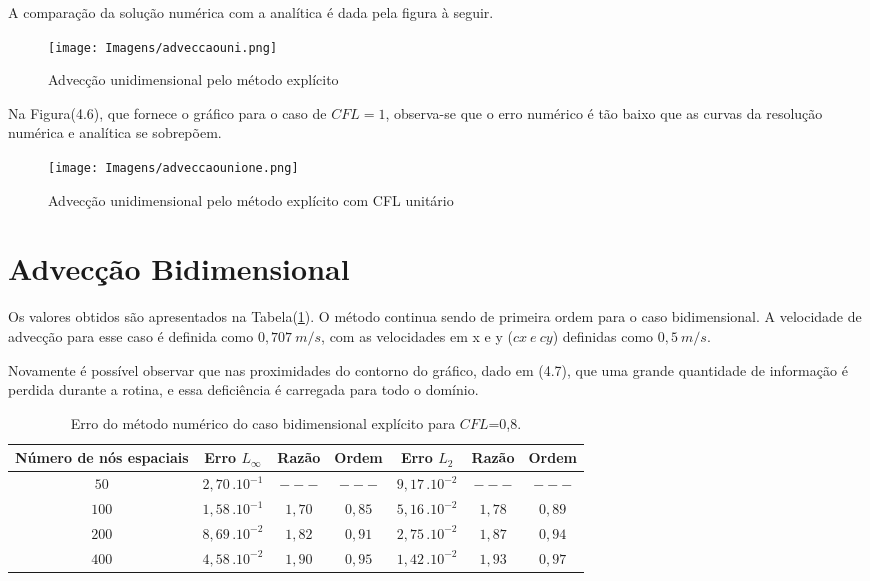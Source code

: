 	A comparação da solução numérica com a analítica é dada pela figura à seguir.
	
\begin{figure}[ht!]
	\label{advexplicito}
	\centering
	\texttt{[image: Imagens/adveccaouni.png]}
	\caption{Advecção unidimensional pelo método explícito}
\end{figure}

	Na Figura(4.6), que fornece o gráfico para o caso de $CFL=1$, observa-se que o erro numérico é tão baixo que as curvas da resolução numérica e analítica se sobrepõem.

\newpage

\begin{figure}[ht!]
	\label{advexplicitoone}
	\centering
	\texttt{[image: Imagens/adveccaounione.png]}
	\caption{Advecção unidimensional pelo método explícito com CFL unitário}
\end{figure}	

\section{Advecção Bidimensional}
\noindent

	Os valores obtidos são apresentados na Tabela(\ref{tabela6}). O método continua sendo de primeira ordem para o caso bidimensional. A velocidade de advecção para esse caso é definida como $0,707 \ m/s$, com as velocidades em x e y ($cx \ e\  cy$) definidas como $0,5 \ m/s$.
	
	Novamente é possível observar que nas proximidades do contorno do gráfico, dado em (4.7), que uma grande quantidade de informação é perdida durante a rotina, e essa deficiência é carregada para todo o domínio.
	
	\begin{table}[h!]
	\caption{Erro do método numérico do caso bidimensional explícito para $CFL$=0,8.}
	\label{tabela6}
	\centering
	\begin{tabular}{c | c c c | c c c}
		\hline
		Número de nós  espaciais&       Erro $L_\infty$       	& Razão   	 & Ordem   & Erro $L_{2}$ 				& Razão 	  & Ordem  \\ \hline
		$50$ 					&		$2,70 \, . 10^{-1}$     & $---$      & $---$   &       $9,17 \, . 10^{-2}$  & $---$       & $---$    \\ 
		$100$ 					&       $1,58 \, . 10^{-1}$     & $1,70$     & $0,85$  &       $5,16 \, . 10^{-2}$  & $1,78$      & $0,89$    \\ 
		$200$ 					&       $8,69 \, . 10^{-2}$     & $1,82$     & $0,91$  &       $2,75 \, . 10^{-2}$  & $1,87$      & $0,94$    \\ 
		$400$ 					&       $4,58 \, . 10^{-2}$     & $1,90$     & $0,95$  &       $1,42 \, . 10^{-2}$  & $1,93$      & $0,97$    \\ \hline
	\end{tabular}
\end{table}	

